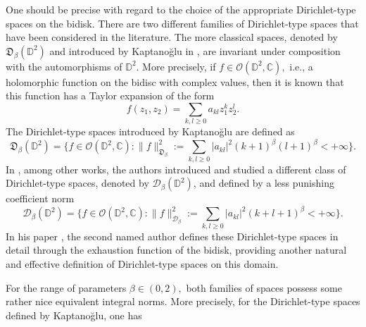 \documentclass[a4paper,12pt]{amsart}
\theoremstyle{definition}
\begin{document}
 One should be precise with regard to the choice of the appropriate Dirichlet-type spaces on the bidisk. There are two different families of Dirichlet-type spaces that have been
considered in the literature. The more classical spaces, denoted by
\(\mathfrak D_\beta(\mathbb D^2)\) and introduced by Kaptano\u glu in \cite{Kaptanoglu1994}, are
invariant under composition with the automorphisms of \(\mathbb D^2\). More precisely, if $f\in \mathcal{O}(\mathbb{D}^2,\mathbb{C}),$ i.e., a holomorphic function on the bidisc with complex values, then it is known that this function has a Taylor expansion of the form
\[
    f(z_1,z_2)
    =
    \sum_{k,l\geq0}a_{kl}z_1^kz_2^l.
\]
The Dirichlet-type spaces introduced by Kaptano\u glu are defined as
\[ \mathfrak{D}_{\beta}(\mathbb{D}^2)=\Bigg\{f\in\mathcal{O}(\mathbb{D}^2,\mathbb{C}):
    \|f\|_{\mathfrak D_{\beta}}^2
    :=
    \sum_{k,l\geq0}
    |a_{kl}|^2(k+1)^\beta(l+1)^\beta<+\infty\Bigg\}.
\]
In \cite{Pouriya_FirstPaper, BesliSola,PoletskyStessin2008}, among other works, the authors introduced and studied a different class of Dirichlet-type spaces, denoted by \(\mathcal D_\beta(\mathbb D^2)\), and defined by a less punishing coefficient norm
\[
\mathcal D_{\beta}(\mathbb{D}^2)=\Bigg\{f\in\mathcal{O}(\mathbb{D}^2,\mathbb{C}):
    \|f\|_{\mathcal D_{\beta}}^2
    :=
    \sum_{k,l\geq0}
    |a_{kl}|^2(k+l+1)^\beta<+\infty\Bigg\}.
\]
In his paper \cite{Pouriya_FirstPaper}, the second named author defines these Dirichlet-type spaces in detail through the exhaustion function of the bidisk, providing another natural and effective definition of Dirichlet-type spaces on this domain.

For the range of parameters $\beta\in (0,2),$ both families of spaces possess some rather nice equivalent integral norms. More precisely, for the Dirichlet-type spaces defined by Kaptano\u glu, one has
\end{document}
